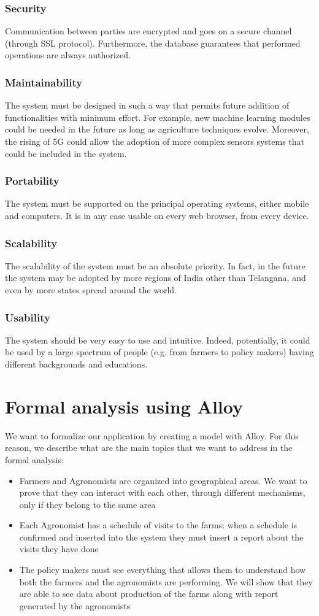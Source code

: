 \documentclass[10pt]{report}
\begin{document}
\subsection{Security}
Communication between parties are encrypted and goes on a secure channel (through SSL protocol). Furthermore, the database guarantees that performed operations are always authorized.
\subsection{Maintainability}
The system must be designed in such a way that permits future addition of functionalities with minimum effort. For example, new machine learning modules could be needed in the future as long as agriculture techniques evolve. Moreover, the rising of 5G could allow the adoption of more complex sensors systems that could be included in the system.
\subsection{Portability}
The system must be supported on the principal operating systems, either mobile and computers. It is in any case usable on every web browser, from every device.
\subsection{Scalability}
The scalability of the system must be an absolute priority. In fact, in the future the system may be adopted by more regions of India other than Telangana, and even by more states spread around the world.
\subsection{Usability}
The system should be very easy to use and intuitive. Indeed, potentially, it could be used by a large spectrum of people (e.g. from farmers to policy makers) having different backgrounds and educations.
\chapter{Formal analysis using Alloy}
We want to formalize our application by creating a model with Alloy. For this reason, we describe what are the main topics that we want to address in the formal analysis:

\begin{itemize}
  \item Farmers and Agronomists are organized into geographical areas. We want to prove that they can interact with each other, through different mechanisms, only if they belong to the same area
  \item Each Agronomist has a schedule of visits to the farms: when a schedule is confirmed and inserted into the system they must insert a report about the visits they have done
  \item The policy makers must see everything that allows them to understand how both the farmers and the agronomists are performing. We will show that they are able to see data about production of the farms along with report generated by the agronomists
\end{itemize}
\end{document}
